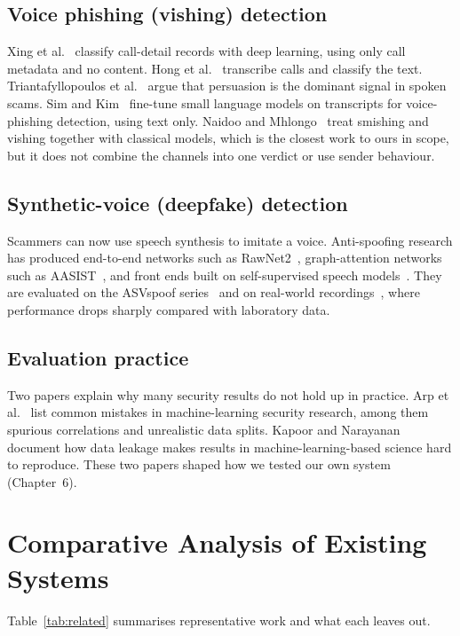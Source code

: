 {\subsection{Voice phishing (vishing) detection}
Xing et al.~\cite{xing2020fraudcall} classify call-detail records with deep learning, using only call metadata and no content. Hong et al.~\cite{hong2023scamcalls} transcribe calls and classify the text. Triantafyllopoulos et al.~\cite{triantafyllopoulos2025vishing} argue that persuasion is the dominant signal in spoken scams. Sim and Kim~\cite{sim2025slm} fine-tune small language models on transcripts for voice-phishing detection, using text only. Naidoo and Mhlongo~\cite{naidoo2024smishvish} treat smishing and vishing together with classical models, which is the closest work to ours in scope, but it does not combine the channels into one verdict or use sender behaviour.

\subsection{Synthetic-voice (deepfake) detection}
Scammers can now use speech synthesis to imitate a voice. Anti-spoofing research has produced end-to-end networks such as RawNet2~\cite{tak2021rawnet2}, graph-attention networks such as AASIST~\cite{jung2022aasist}, and front ends built on self-supervised speech models~\cite{tak2022ssl}. They are evaluated on the ASVspoof series~\cite{wang2020asvspoof2019,liu2023asvspoof2021,wang2024asvspoof5} and on real-world recordings~\cite{muller2022itw}, where performance drops sharply compared with laboratory data.

\subsection{Evaluation practice}
Two papers explain why many security results do not hold up in practice. Arp et al.~\cite{arp2022dos} list common mistakes in machine-learning security research, among them spurious correlations and unrealistic data splits. Kapoor and Narayanan~\cite{kapoor2023leakage} document how data leakage makes results in machine-learning-based science hard to reproduce. These two papers shaped how we tested our own system (Chapter~6).

\section{Comparative Analysis of Existing Systems}
Table~\ref{tab:related} summarises representative work and what each leaves out.

}
